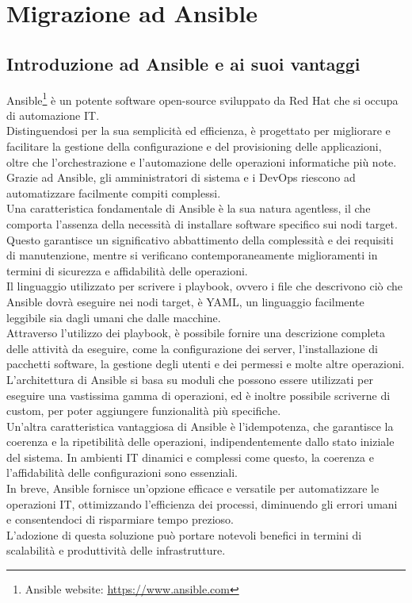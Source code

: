 \chapter{Migrazione ad Ansible}
\label{cha:migrazione}

\section{Introduzione ad Ansible e ai suoi vantaggi}
\label{sec:ansible}

Ansible\footnote{Ansible website: \url{https://www.ansible.com}} è un potente
software open-source sviluppato da Red Hat che si occupa di automazione IT.\\
Distinguendosi per la sua semplicità ed efficienza, è progettato per migliorare e
facilitare la gestione della configurazione e del provisioning delle applicazioni,
oltre che l'orchestrazione e l'automazione delle operazioni informatiche più
note.\\ Grazie ad Ansible, gli amministratori di sistema e i DevOps riescono ad automatizzare
facilmente compiti complessi.\\ Una caratteristica fondamentale di Ansible è la sua
natura agentless, il che comporta l'assenza della necessità di installare
software specifico sui nodi target. Questo garantisce un significativo abbattimento
della complessità e dei requisiti di manutenzione, mentre si verificano
contemporaneamente miglioramenti in termini di sicurezza e affidabilità delle
operazioni.\\ Il linguaggio utilizzato per scrivere i playbook, ovvero i file che
descrivono ciò che Ansible dovrà eseguire nei nodi target, è YAML, un linguaggio
facilmente leggibile sia dagli umani che dalle macchine.\\ Attraverso l'utilizzo
dei playbook, è possibile fornire una descrizione completa delle attività da
eseguire, come la configurazione dei server, l'installazione di pacchetti
software, la gestione degli utenti e dei permessi e molte altre operazioni.\\ L'architettura
di Ansible si basa su moduli che possono essere utilizzati per eseguire una vastissima
gamma di operazioni, ed è inoltre possibile scriverne di custom, per poter aggiungere
funzionalità più specifiche.\\ Un'altra caratteristica vantaggiosa di Ansible è l'idempotenza,
che garantisce la coerenza e la ripetibilità delle operazioni, indipendentemente
dallo stato iniziale del sistema. In ambienti IT dinamici e complessi come
questo, la coerenza e l'affidabilità delle configurazioni sono essenziali.\\ In breve,
Ansible fornisce un'opzione efficace e versatile per automatizzare le operazioni
IT, ottimizzando l'efficienza dei processi, diminuendo gli errori umani e
consentendoci di risparmiare tempo prezioso.\\ L'adozione di questa soluzione
può portare notevoli benefici in termini di scalabilità e produttività delle
infrastrutture.

